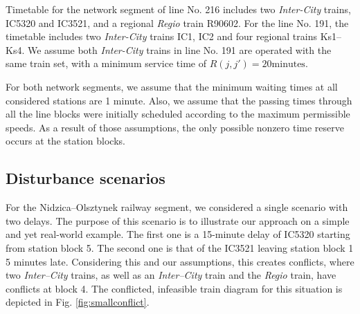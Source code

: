 Timetable for the network segment of line No. 216 includes two
\emph{Inter-City} trains, IC5320 and IC3521, and a regional \emph{Regio} train
R90602. For the line No. 191, the timetable includes two \emph{Inter-City}
trains IC1, IC2 and four regional trains Ks1--Ks4. We assume both
\emph{Inter-City} trains in line No. 191 are operated with the same train set,
with a minimum service time of $R(j,j') = 20\mbox{minutes}$.

For both network segments, we assume that the minimum waiting times at all
considered stations are 1 minute. Also, we assume that the passing times
through all the line blocks were initially scheduled according to the maximum
permissible speeds. As a result of those assumptions, the only possible nonzero
time reserve occurs at the station blocks.

\subsection{Disturbance scenarios}

For the Nidzica--Olsztynek railway segment, we considered a single scenario
with two delays. The purpose of this scenario is to illustrate our approach on
a simple and yet real-world example. The first one is a 15-minute delay of
IC5320 starting from station block 5. The second one is that of the IC3521
leaving station block 1 5 minutes late. Considering this and our assumptions,
this creates conflicts, where two \emph{Inter--City} trains, as well as an
\emph{Inter--City} train and the \emph{Regio} train, have conflicts at block 4.
The conflicted, infeasible train diagram for this situation is depicted in Fig.
\ref{fig:smallconflict}.

